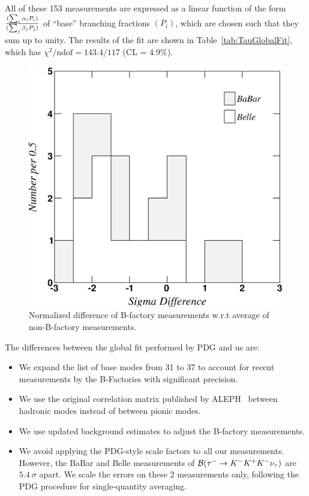 \documentclass[fleqn,twoside]{article}
\begin{document}
All of these 153 measurements are expressed as a linear function
of the form $(\sum_i \alpha_i P_i )\over(\sum_j \beta_j P_j )$ 
of ``base'' branching fractions $(P_i)$, 
which are chosen such that they sum up to unity.
The results of the fit are shown in Table~\ref{tab:TauGlobalFit},
which has $\chi^2/\mathrm{ndof} = 143.4/117$ (CL = 4.9\%). 

\begin{figure}[!hbtp]
\begin{center}
\includegraphics[height=.4\textheight,width=.49\textwidth]{figures/compare_with_NoBB.eps}
\end{center}
\caption{Normalized difference of B-factory measurements w.r.t average of non-B-factory measurements.}
\label{fig:comp_NoBB}
\end{figure}
 
The differences between the global fit performed by PDG and us are:
\begin{itemize}
\item We expand the list of base modes from 31 to 37 to account for recent
  measurements by the B-Factories with significant precision.
\item We use the original correlation matrix published by
 ALEPH~\cite{Schael:2005am} between hadronic modes instead of between
 pionic modes.
\item We use updated background estimates to adjust the B-factory measurements.
\item We avoid applying the PDG-style scale factors to all our measurements.
However, the BaBar and Belle measurements of ${\cal{B}}({\tau^- \to
  K^-K^+K^-\nu_\tau})$ are $5.4~\sigma$ apart. We scale the errors on
these 2 measurements only, following the PDG procedure for
single-quantity averaging.
\end{itemize}
\end{document}
